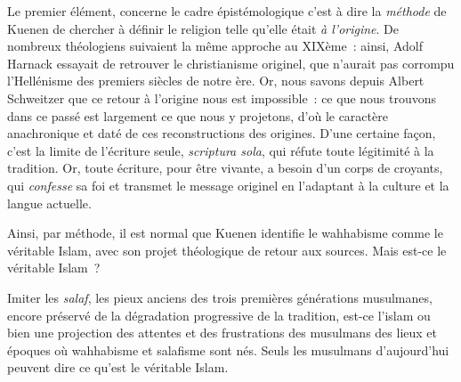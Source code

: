 Le premier élément, concerne le cadre épistémologique c'est à dire la
\emph{méthode} de Kuenen de chercher à définir le religion telle qu'elle
était \emph{à l'origine}. De nombreux théologiens suivaient la même
approche au XIXème~: ainsi, Adolf Harnack essayait de retrouver le
christianisme originel, que n'aurait pas corrompu l'Hellénisme des
premiers siècles de notre ère. Or, nous savons depuis Albert
Schweitzer que ce retour à l'origine nous est
impossible~: ce que nous trouvons dans ce passé est largement ce que
nous y projetons, d'où le caractère anachronique et daté de ces
reconstructions des origines. D'une certaine façon, c'est la limite de
l'écriture seule, \emph{scriptura sola}, qui réfute toute légitimité à
la tradition. Or, toute écriture, pour être vivante, a besoin d'un corps
de croyants, qui \emph{confesse} sa foi et transmet le message originel
en l'adaptant à la culture et la langue actuelle.

Ainsi, par méthode, il est normal que Kuenen identifie le wahhabisme
comme le véritable Islam, avec son projet théologique de retour aux
sources. Mais est-ce le véritable Islam~?

Imiter les \emph{salaf}, les pieux anciens des trois premières
générations musulmanes, encore préservé de la dégradation progressive de
la tradition, est-ce l'islam ou bien une projection
des attentes et des frustrations des musulmans des lieux et époques où
wahhabisme et salafisme sont nés. Seuls les
musulmans d'aujourd'hui peuvent dire ce qu'est le véritable Islam.

